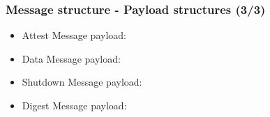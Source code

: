 \begin{frame}
  \frametitle{Message structure - Payload structures (3/3)}

\begin{minipage}{.47\textwidth}

  \begin{itemize}
  \item Attest Message payload:
  \begin{figure}[H]
  \end{figure}
  
  \item Data Message payload:
  \begin{figure}[H]
  \end{figure}
  \end{itemize}
  
\end{minipage}
\begin{minipage}{.47\textwidth}

  \begin{itemize}
  \item Shutdown Message payload:
  \begin{figure}[H]
  \end{figure}

  \item Digest Message payload:
  \begin{figure}[H]
  \end{figure}    
  

\end{itemize}
\end{minipage}
\end{frame}
